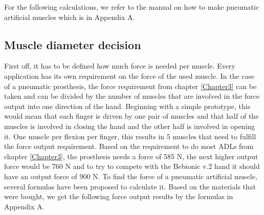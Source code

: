 \documentclass[main]{subfiles}
\begin{document}



For the following calculations, we refer to the manual on how to make pneumatic artificial muscles which is in Appendix A.



\subsection{Muscle diameter decision}

First off, it has to be defined how much force is needed per muscle. Every application has its own requirement on the force of the used muscle. In the case of a pneumatic prosthesis, the force requirement from chapter \ref{Chapter3} can be taken and can be divided by the number of muscles that are involved in the force output into one direction of the hand. Beginning with a simple prototype, this would mean that each finger is driven by one pair of muscles and that half of the muscles is involved in closing the hand and the other half is involved in opening it. One muscle per flexion per finger, this results in 5 muscles that need to fulfill the force output requirement. Based on the requirement to do most ADLs from chapter \ref{Chapter3}, the prosthesis needs a force of 585 N, the next higher output force would be 760 N and to try to compete with the Bebionic v.2 hand it should have an output force of 900 N. To find the force of a pneumatic artificial muscle, several formulas have been proposed to calculate it. Based on the materials that were bought, we get the following force output results by the formulas in Appendix A.
\end{document}
